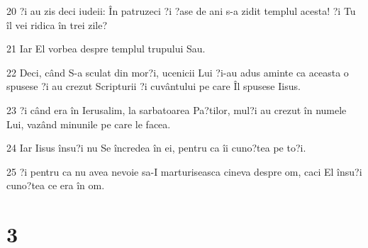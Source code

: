 \par 20 ?i au zis deci iudeii: În patruzeci ?i ?ase de ani s-a zidit templul acesta! ?i Tu îl vei ridica în trei zile?
\par 21 Iar El vorbea despre templul trupului Sau.
\par 22 Deci, când S-a sculat din mor?i, ucenicii Lui ?i-au adus aminte ca aceasta o spusese ?i au crezut Scripturii ?i cuvântului pe care Îl spusese Iisus.
\par 23 ?i când era în Ierusalim, la sarbatoarea Pa?tilor, mul?i au crezut în numele Lui, vazând minunile pe care le facea.
\par 24 Iar Iisus însu?i nu Se încredea în ei, pentru ca îi cuno?tea pe to?i.
\par 25 ?i pentru ca nu avea nevoie sa-I marturiseasca cineva despre om, caci El însu?i cuno?tea ce era în om.

\chapter{3}

